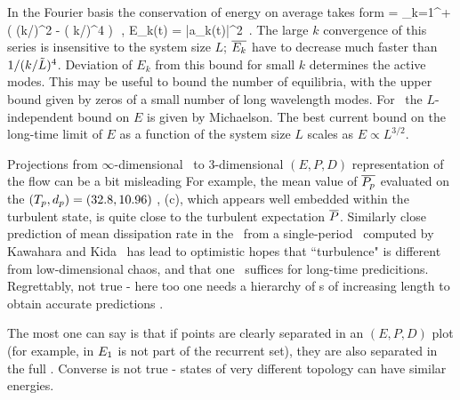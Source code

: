 In the Fourier basis  the conservation of energy on average
takes form
 = \sum_{k=1}^{+\infty} ( (k/\tildeL)^2 - ( k/\tildeL)^4 )\,
\,,\qquad
E_k(t) =  |a_k(t)|^2
\,.
The large $k$ convergence of this series is insensitive to the
system size $L$; $\overline{E_k}$ have to decrease much faster than
$1/( k/\tilde{L})^4$.
Deviation of $E_k$ from this bound for small $k$ determines the active modes.
This may be useful to bound the number of equilibria, with
the upper bound given by zeros of a small number
of long wavelength modes.
For \eqva\ the $L$-independent bound
    on $E$ is given by Michaelson. 
The best current bound\cite{GiacoOtto05,bronski-2005} on the long-time limit
of $E$
as a function of the system size $L$ scales as 
$E \propto L^{3/2}$.
%
%


Projections 
from $\infty$-dimensional \statesp\ to 3-dimensional
$(E,P,D)$ representation of the flow can be a bit misleading
For example, the mean value of $\overline{P_p}$
evaluated on the
$({T_{p}},d_p) =(32.8,10.96)$
 {\rpo}, (c), which appears well embedded
within the turbulent state, is quite close to the turbulent
expectation $\overline{P}$.
Similarly close prediction of mean dissipation rate in the
\pCf\ from a single-period \po\ computed by
Kawahara and Kida~\cite{KawKida01} has lead to 
optimistic hopes that ``turbulence" is different from
low-dimensional chaos, and that one \po\ suffices for long-time
predicitions. Regrettably, not true - here too one needs a hierarchy
of \po s of increasing length to obtain accurate
predictions \cite{DasBuch}.

The most one can say is that if points are clearly separated in an
$(E,P,D)$ plot (for example, in 
$E_{1}$ is not part of the recurrent set), they are also separated
in the full \statesp. Converse is not true - states of 
very different topology can have similar energies.
